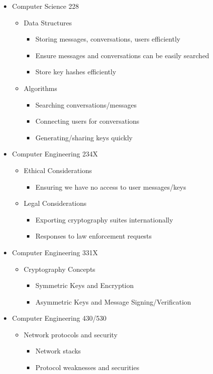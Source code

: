 \documentclass[11pt]{article}
\begin{document}
\begin{itemize}
	\item{Computer Science 228}
	\begin{itemize}
		\item{Data Structures}
		\begin{itemize}
			\item{Storing messages, conversations, users efficiently}
			\item{Ensure messages and conversations can be easily searched}
			\item{Store key hashes efficiently}
		\end{itemize}
		\item{Algorithms}
		\begin{itemize}
			\item{Searching conversations/messages}
			\item{Connecting users for conversations}
			\item{Generating/sharing keys quickly}
		\end{itemize}
	\end{itemize}
	
	\item{Computer Engineering 234X}
	\begin{itemize}
		\item{Ethical Considerations}
		\begin{itemize}
			\item{Ensuring we have no access to user messages/keys}
		\end{itemize}
		\item{Legal Considerations}
		\begin{itemize}
			\item{Exporting cryptography suites internationally}
			\item{Responses to law enforcement requests}
		\end{itemize}
	\end{itemize}
	\item{Computer Engineering 331X}
	\begin{itemize}
		\item{Cryptography Concepts}
		\begin{itemize}
			\item{Symmetric Keys and Encryption}
			\item{Asymmetric Keys and Message Signing/Verification}
		\end{itemize}
	\end{itemize}
	\item{Computer Engineering 430/530}
	\begin{itemize}
		\item{Network protocols and security}
		\begin{itemize}
			\item{Network stacks}
			\item{Protocol weaknesses and securities}
		\end{itemize}
	\end{itemize}
\end{itemize}
\end{document}
